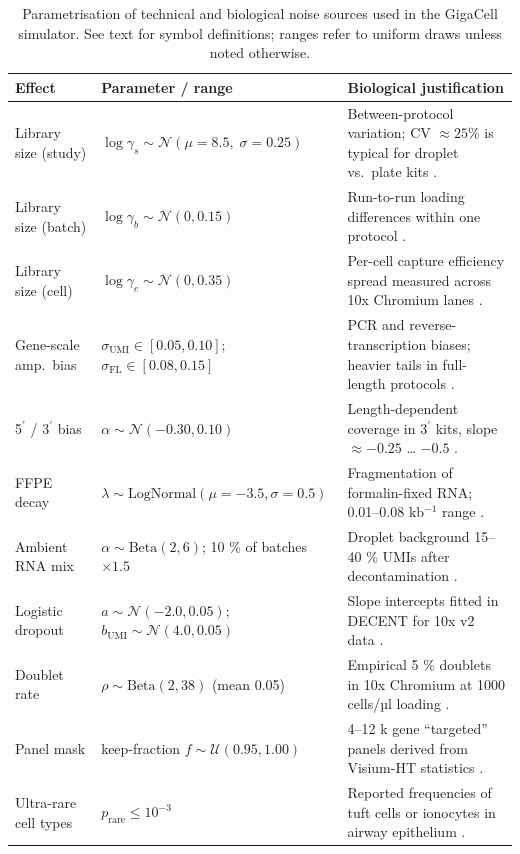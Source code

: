 \documentclass{article}
\begin{document}
\begin{table}[h!]
	\centering\small
	\caption{Parametrisation of technical and biological noise sources used in the
		GigaCell simulator.  See text for symbol definitions; ranges refer
		to uniform draws unless noted otherwise.}
	\label{tab:noise_effects}
	\begin{tabular}{@{}lp{3.5cm}p{6.6cm}@{}}
		\toprule
		\textbf{Effect} & \textbf{Parameter / range} & \textbf{Biological justification} \\ \midrule
		Library size (study) & $\log\gamma_s\!\sim\!\mathcal N(\mu\!=\!8.5,\;\sigma\!=\!0.25)$ &
		Between-protocol variation; CV $\approx25\%$ is typical for droplet vs.\ plate kits \cite{Ziegenhain2017}.\\
		Library size (batch) & $\log\gamma_b\!\sim\!\mathcal N(0,0.15)$ &
		Run-to-run loading differences within one protocol \cite{Hicks2018}.\\
		Library size (cell) & $\log\gamma_c\!\sim\!\mathcal N(0,0.35)$ &
		Per-cell capture efficiency spread measured across 10x Chromium lanes \cite{Zheng2017}.\\
		Gene-scale amp.\ bias & $\sigma_{\text{UMI}}\!\in\![0.05,0.10]$;
		$\sigma_{\text{FL}}\!\in\![0.08,0.15]$ &
		PCR and reverse-transcription biases; heavier tails in full-length protocols \cite{Phipson2017}.\\
		5$^\prime$ / 3$^\prime$ bias & $\alpha\!\sim\!\mathcal N(-0.30,0.10)$ &
		Length-dependent coverage in 3$^\prime$ kits, slope $\approx -0.25$ … $-0.5$ \cite{Parekh2016}.\\
		FFPE decay & $\lambda\!\sim\!\text{LogNormal}(\mu=-3.5,\sigma=0.5)$ &
		Fragmentation of formalin-fixed RNA; 0.01–0.08 kb$^{-1}$ range \cite{Srinivasan2002}.\\
		Ambient RNA mix & $\alpha\!\sim\!\text{Beta}(2,6)$; 10 \% of batches $\times1.5$ &
		Droplet background 15–40 \% UMIs after decontamination \cite{Young2020}.\\
		Logistic dropout & $a\!\sim\!\mathcal N(-2.0,0.05)$;
		$b_{\text{UMI}}\!\sim\!\mathcal N(4.0,0.05)$ &
		Slope intercepts fitted in DECENT for 10x v2 data \cite{Ye2019}.\\
		Doublet rate & $\rho\!\sim\!\text{Beta}(2,38)$ (mean 0.05) &
		Empirical 5 \% doublets in 10x Chromium at 1000 cells/µl loading \cite{Zheng2017}.\\
		Panel mask & keep‐fraction $f\!\sim\!\mathcal U(0.95,1.00)$ &
		4–12 k gene “targeted” panels derived from Visium-HT statistics \cite{Andrews2021}.\\
		Ultra-rare cell types & $p_{\text{rare}}\le10^{-3}$ &
		Reported frequencies of tuft cells or ionocytes in airway epithelium \cite{Plasschaert2018}.\\ \bottomrule
	\end{tabular}
\end{table}
\end{document}
